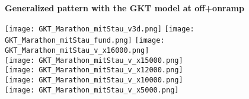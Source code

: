 \documentclass[a4paper,12pt]{scrartcl}
\begin{document}
\begin{center}

{\Large\sf\textbf{Generalized pattern with the GKT model at off+onramp}}


\hspace*{-40mm}
\texttt{[image: GKT\_Marathon\_mitStau\_v3d.png]}
\hspace*{-5mm}
\texttt{[image: GKT\_Marathon\_mitStau\_fund.png]}
\texttt{[image: GKT\_Marathon\_mitStau\_v\_x16000.png]} \\[-2mm]
\texttt{[image: GKT\_Marathon\_mitStau\_v\_x15000.png]} \\[-2mm]
\texttt{[image: GKT\_Marathon\_mitStau\_v\_x12000.png]} \\[-2mm]
\texttt{[image: GKT\_Marathon\_mitStau\_v\_x10000.png]} \\[-2mm]
\texttt{[image: GKT\_Marathon\_mitStau\_v\_x5000.png]}
\end{center}





\end{document}
